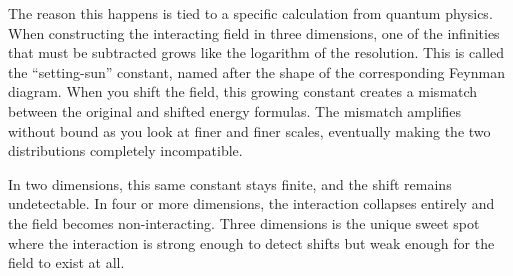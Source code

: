 The reason this happens is tied to a specific calculation from
quantum physics. When constructing the interacting field in three
dimensions, one of the infinities that must be subtracted grows
like the logarithm of the resolution. This is called the
``setting-sun'' constant, named after the shape of the corresponding
Feynman diagram. When you shift the field, this growing constant
creates a mismatch between the original and shifted energy formulas.
The mismatch amplifies without bound as you look at finer and finer
scales, eventually making the two distributions completely
incompatible.

In two dimensions, this same constant stays finite, and the shift
remains undetectable. In four or more dimensions, the interaction
collapses entirely and the field becomes non-interacting. Three
dimensions is the unique sweet spot where the interaction is strong
enough to detect shifts but weak enough for the field to exist at all.
